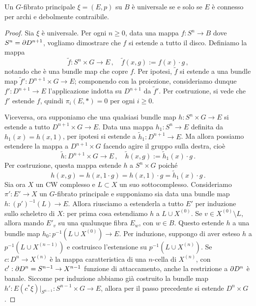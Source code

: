 \begin{thm}
	Un $G$-fibrato principale $\xi = (E,p)$ su $B$ è universale
	se e solo se $E$ è connesso per archi e debolmente contraibile.
	\begin{proof}
		Sia $\xi$ è universale. Per ogni $n \ge 0$,
		data una mappa $f:S^{n} \to B$ dove $S^{n}=\partial D^{n+1}$,
		vogliamo dimostrare che $f$ si estende a tutto il disco.
		Definiamo la mappa
		\begin{equation*}
			\widetilde{f} : S^{n} \times G \longrightarrow E\,,
			\quad \widetilde{f}(x,g) := f(x) \cdot g\,,
		\end{equation*}
		notando che è una bundle map che copre $f$.
		Per ipotesi, $\widetilde{f}$ si estende a una bundle map 
		$\widetilde{f}':D^{n+1} \times G \to E$; componendo con la proiezione,
		consideriamo dunque $f':D^{n+1} \to E$ l'applicazione indotta su $D^{n+1}$
		da $\widetilde{f}'$. Per costruzione, si vede che $f'$ estende $f$,
		quindi $\pi_{i}(E,\ast) = 0$ per ogni $i \ge 0$.
		
		Viceversa, ora supponiamo che una qualsiasi bundle map
		$h:S^{n} \times G \to E$ si estende a tutto $D^{n+1} \times G \to E$.
		Data una mappa $h_{1}:S^{n} \to E$ definita da $h_{1}(x) = h(x,1)$,
		per ipotesi si estende a $\widetilde{h}_{1}:D^{n+1} \to E$.
		Ma allora possiamo estendere la mappa a $D^{n+1} \times G$
		facendo agire il gruppo sulla destra, cioè
		\begin{equation*}
			\widetilde{h} : D^{n+1} \times G \longrightarrow E\,,
			\quad \widetilde{h}(x,g) := \widetilde{h}_{1}(x) \cdot g\,.
		\end{equation*}
		Per costruzione, questa mappa estende $h$ a $S^{n} \times G$ poiché
		\begin{equation*}
			h(x,g) = h(x,1 \cdot g) = h(x,1) \cdot g = \widetilde{h}_{1}(x) \cdot g\,.
		\end{equation*}
		Sia ora $X$ un CW complesso e $L \subset X$ un suo sottocomplesso.
		Consideriamo $\pi':E' \to X$ un $G$-fibrato principale e
		supponiamo sia data una bundle map $h:(p')^{-1}(L) \to E$.
		Allora riusciamo a estenderla a tutto $E'$ per induzione sullo scheletro di $X$:
		per prima cosa estendiamo $h$ a $L \cup X^{(0)}$. Se $v \in X^{(0)} \setminus L$,
		allora mando $E'_{v}$ su una qualunque fibra $E_{w}$, con $w \in B$.
		Questo estende $h$ a una bundle map $h_{0}:p^{-1}(L \cup X^{(0)}) \to E$.
		Per induzione, suppongo di aver esteso $h$ a $p^{-1}(L \cup X^{(n-1)})$
		e costruisco l'estensione su $p^{-1}(L \cup X^{(n)})$.
		Se $c:D^{n} \to X^{(n)}$ è la mappa caratteristica di una $n$-cella di $X^{(n)}$,
		con $c':\partial D^{n} = S^{n-1} \to X^{n-1}$ funzione di attaccamento,
		anche la restrizione a $\partial D^{n}$ è banale.
		Siccome per induzione abbiamo già costruito la bundle map
		$h': E(c^{*}\xi)\vert_{S^{n-1}} : S^{n-1} \times G \to E$,
		allora per il passo precedente si estende $D^{n} \times G$.
	\end{proof}
\end{thm} 


